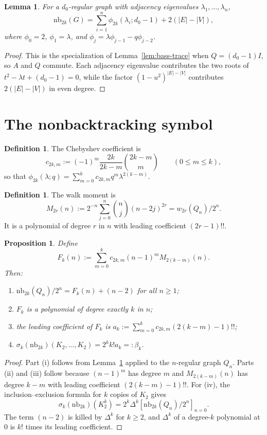 \documentclass[11pt]{amsart}
\newcommand{\nb}{\mathrm{nb}}
\newtheorem{proposition}[theorem]{Proposition}
\newtheorem{lemma}[theorem]{Lemma}
\theoremstyle{definition}
\newtheorem{definition}[theorem]{Definition}
\theoremstyle{remark}
\begin{document}
\begin{lemma}\label{lem:regular-spectral}
For a $d_0$-regular graph with adjacency eigenvalues $\lambda_1,\ldots,\lambda_n$,
\[
   \nb_{2k}(G)=\sum_{i=1}^n \phi_{2k}(\lambda_i;d_0-1)+2(|E|-|V|),
\]
where $\phi_0=2$, $\phi_1=\lambda$, and $\phi_j=\lambda\phi_{j-1}-q\phi_{j-2}$.
\end{lemma}

\begin{proof}
This is the specialization of Lemma~\ref{lem:bass-trace} when $Q=(d_0-1)I$, so $A$ and $Q$ commute. Each adjacency eigenvalue contributes the two roots of $t^2-\lambda t+(d_0-1)=0$, while the factor $(1-u^2)^{|E|-|V|}$ contributes $2(|E|-|V|)$ in even degree.
\end{proof}

\section{The nonbacktracking symbol}

\begin{definition}\label{def:cheb-coeff}
The Chebyshev coefficient is
\[
   c_{2k,m}:=(-1)^m \frac{2k}{2k-m}\binom{2k-m}{m}\qquad(0\le m\le k),
\]
so that $\phi_{2k}(\lambda;q)=\sum_{m=0}^k c_{2k,m}q^m\lambda^{2(k-m)}$.
\end{definition}

\begin{definition}\label{def:walk-moment}
The walk moment is
\[
   M_{2r}(n):=2^{-n}\sum_{j=0}^n \binom{n}{j}(n-2j)^{2r}=w_{2r}(Q_n)/2^n.
\]
It is a polynomial of degree $r$ in $n$ with leading coefficient $(2r-1)!!$.
\end{definition}

\begin{proposition}\label{prop:nb-coefficient}
Define
\[
   F_k(n):=\sum_{m=0}^k c_{2k,m}(n-1)^mM_{2(k-m)}(n).
\]
Then:
\begin{enumerate}[label=(\roman*)]
\item $\nb_{2k}(Q_n)/2^n=F_k(n)+(n-2)$ for all $n\ge1$;
\item $F_k$ is a polynomial of degree exactly $k$ in $n$;
\item the leading coefficient of $F_k$ is $a_k:=\sum_{m=0}^k c_{2k,m}(2(k-m)-1)!!$;
\item $\sigma_k(\nb_{2k})(K_2,\ldots,K_2)=2^k k!a_k=:\beta_k$.
\end{enumerate}
\end{proposition}

\begin{proof}
Part (i) follows from Lemma~\ref{lem:regular-spectral} applied to the $n$-regular graph $Q_n$. Parts (ii) and (iii) follow because $(n-1)^m$ has degree $m$ and $M_{2(k-m)}(n)$ has degree $k-m$ with leading coefficient $(2(k-m)-1)!!$. For (iv), the inclusion--exclusion formula for $k$ copies of $K_2$ gives
\[
   \sigma_k(\nb_{2k})(K_2^k)=2^k\Delta^k[\nb_{2k}(Q_n)/2^n]_{n=0}.
\]
The term $(n-2)$ is killed by $\Delta^k$ for $k\ge2$, and $\Delta^k$ of a degree-$k$ polynomial at $0$ is $k!$ times its leading coefficient.
\end{proof}
\end{document}
